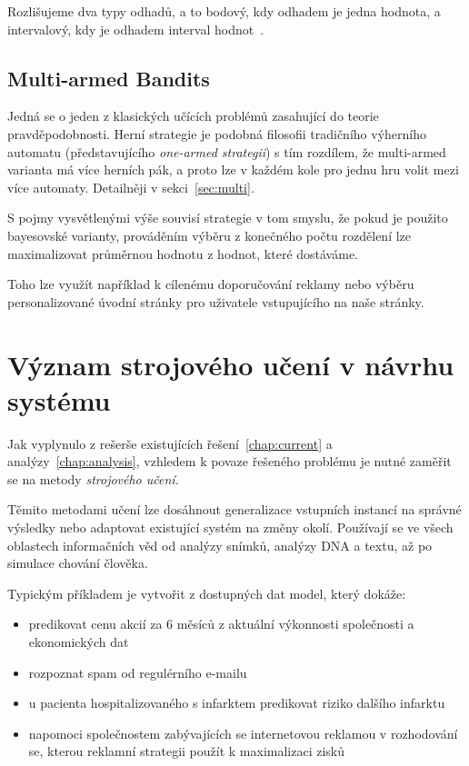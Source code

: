 \documentclass[thesis=M,czech]{FITthesis}[2014/05/07]
\begin{document}
Rozlišujeme dva typy odhadů, a to bodový, kdy odhadem je jedna hodnota, a intervalový, kdy je odhadem interval hodnot~\cite{pst5}. 

\subsection{Multi-armed Bandits}
Jedná se o jeden z klasických učících problémů zasahující do teorie pravděpodobnosti. Herní strategie je podobná filosofii tradičního výherního automatu (představujícího \emph{one-armed strategii}) s tím rozdílem, že multi-armed varianta má více herních pák, a proto lze v každém kole pro jednu hru volit mezi více automaty. Detailněji v sekci~\ref{sec:multi}.

S pojmy vysvětlenými výše souvisí strategie v tom smyslu, že pokud je použito bayesovské varianty, prováděním výběru z konečného počtu rozdělení lze maximalizovat průměrnou hodnotu z hodnot, které dostáváme. 

Toho lze využít například k cílenému doporučování reklamy nebo výběru personalizované úvodní stránky pro uživatele vstupujícího na naše stránky.

\section{Význam strojového učení v návrhu systému}
\label{sec:machine}

Jak vyplynulo z rešerše existujících řešení~\ref{chap:current} a analýzy~\ref{chap:analysis}, vzhledem k povaze řešeného problému je nutné zaměřit se na metody \emph{strojového učení}. 

Těmito metodami učení lze dosáhnout generalizace vstupních instancí na správné výsledky nebo adaptovat existující systém na změny okolí. Používají se ve všech oblastech informačních věd od analýzy snímků, analýzy DNA a textu, až po simulace chování člověka. 

Typickým příkladem je vytvořit z dostupných dat model, který dokáže:

\begin{itemize}
  \item predikovat cenu akcií za 6 měsíců z aktuální výkonnosti společnosti a ekonomických dat
  \item rozpoznat spam od regulérního e-mailu
  \item u pacienta hospitalizovaného s infarktem predikovat riziko dalšího infarktu
  \item napomoci společnostem zabývajících se internetovou reklamou v rozhodování se, kterou reklamní strategii použít k maximalizaci zisků
\end{itemize}
\end{document}
